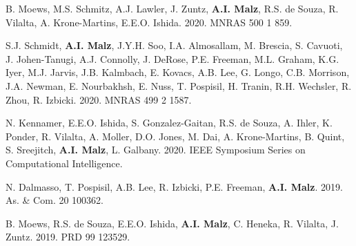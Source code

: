 \begin{etaremune}

\item B. Moews, M.S. Schmitz, A.J. Lawler, J. Zuntz, {\bf A.I. Malz}, R.S. de Souza, R. Vilalta, A. Krone-Martins, E.E.O. Ishida. 2020. MNRAS 500 1 859. 

\item S.J. Schmidt, {\bf A.I. Malz}, J.Y.H. Soo, %
I.A. Almosallam, M. Brescia, S. Cavuoti, J. Johen-Tanugi, A.J. Connolly, J. DeRose, P.E. Freeman, M.L. Graham, K.G. Iyer, M.J. Jarvis, J.B. Kalmbach, E. Kovacs, A.B. Lee, G. Longo, C.B. Morrison, J.A. Newman, E. Nourbakhsh, E. Nuss, T. Pospisil, H. Tranin, R.H. Wechsler, R. Zhou, R. Izbicki. 
2020. MNRAS 499 2 1587. 

\item N. Kennamer, E.E.O. Ishida, S. Gonzalez-Gaitan, R.S. de Souza, A. Ihler, K. Ponder, R. Vilalta, A. Moller, D.O. Jones, M. Dai, A. Krone-Martins, B. Quint, S. Sreejitch, {\bf A.I. Malz}, L. Galbany. 2020. IEEE Symposium Series on
Computational Intelligence. 

\item N. Dalmasso, T. Pospisil, A.B. Lee, R. Izbicki, P.E. Freeman, {\bf A.I. Malz}. 2019. As. \& Com. 20 100362. 

\item B. Moews, R.S. de Souza, E.E.O. Ishida, {\bf A.I. Malz}, C. Heneka, R. Vilalta, J. Zuntz. 2019. PRD 99 123529. 


\end{etaremune}
